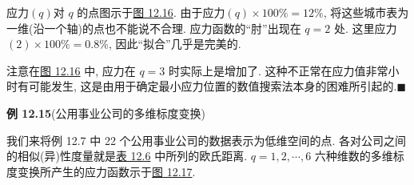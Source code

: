 应力$(q)$对 $q$ 的点图示于\hyperref[fig:12.16]{图 12.16}. 由于应力$(q)\times 100\%=12\%$, 将这些城市表为一维(沿一个轴)的点也不能说不合理. 应力函数的“肘”出现在 $q=2$ 处. 这里应力$(2)\times 100\%=0.8\%$, 因此“拟合”几乎是完美的.

注意在\hyperref[fig:12.16]{图 12.16} 中, 应力在 $q=3$ 时实际上是增加了. 这种不正常在应力值非常小时有可能发生, 这是由用于确定最小应力位置的数值搜索法本身的困难所引起的.\hfill$\blacksquare$

\noindent\textbf{例 12.15}\quad (公用事业公司的多维标度变换)

我们来将例 12.7 中 22 个公用事业公司的数据表示为低维空间的点. 各对公司之间的相似(异)性度量就是\hyperref[tab:12.6]{表 12.6} 中所列的欧氏距离. $q=1,2,\cdots,6$ 六种维数的多维标度变换所产生的应力函数示于\hyperref[fig:12.17]{图 12.17}.
